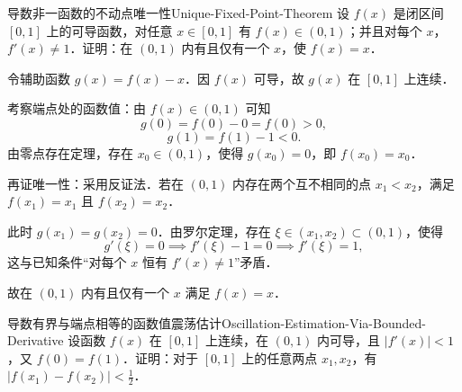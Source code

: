 \begin{problem}{导数非一函数的不动点唯一性}{Unique-Fixed-Point-Theorem}
    设 $f(x)$ 是闭区间 $[0, 1]$ 上的可导函数，对任意 $x \in [0, 1]$ 有 $f(x) \in (0, 1)$；并且对每个 $x$，$f'(x) \neq 1$．证明：在 $(0, 1)$ 内有且仅有一个 $x$，使 $f(x) = x$．
\end{problem}

\begin{myproof}
    令辅助函数 $g(x) = f(x) - x$．因 $f(x)$ 可导，故 $g(x)$ 在 $[0, 1]$ 上连续．

    考察端点处的函数值：由 $f(x) \in (0, 1)$ 可知
    \begin{equation}
        g(0) = f(0) - 0 = f(0) > 0,
    \end{equation}
    \begin{equation}
        g(1) = f(1) - 1 < 0.
    \end{equation}
    由零点存在定理，存在 $x_0 \in (0, 1)$，使得 $g(x_0) = 0$，即 $f(x_0) = x_0$．

    再证唯一性：采用反证法．若在 $(0, 1)$ 内存在两个互不相同的点 $x_1 < x_2$，满足 $f(x_1) = x_1$ 且 $f(x_2) = x_2$．

    此时 $g(x_1) = g(x_2) = 0$．由罗尔定理，存在 $\xi \in (x_1, x_2) \subset (0, 1)$，使得
    \begin{equation}
        g'(\xi) = 0 \implies f'(\xi) - 1 = 0 \implies f'(\xi) = 1,
    \end{equation}
    这与已知条件“对每个 $x$ 恒有 $f'(x) \neq 1$”矛盾．

    故在 $(0, 1)$ 内有且仅有一个 $x$ 满足 $f(x) = x$．
\end{myproof}

\begin{problem}{导数有界与端点相等的函数值震荡估计}{Oscillation-Estimation-Via-Bounded-Derivative}
    设函数 $f(x)$ 在 $[0, 1]$ 上连续，在 $(0, 1)$ 内可导，且 $|f'(x)| < 1$，又 $f(0) = f(1)$．证明：对于 $[0, 1]$ 上的任意两点 $x_1, x_2$，有 $|f(x_1) - f(x_2)| < \frac{1}{2}$．
\end{problem}

